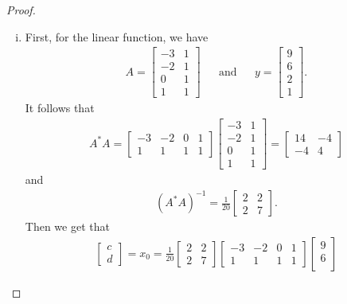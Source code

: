 \documentclass[leqno]{article}
\theoremstyle{nonumberplain}
\newtheorem{proof}{Proof}
\begin{document}
\begin{proof}
\begin{enumerate}[(i)]
\item First, for the linear function, we have 
\begin{align*}
A=\begin{bmatrix}
-3 & 1\\
-2 & 1\\
0 & 1\\
1 & 1
\end{bmatrix}
&&\textrm{and} &&
y=\begin{bmatrix}
9\\
6\\
2\\
1
\end{bmatrix}.
\end{align*}
It follows that
\begin{align*}
A^* A = \begin{bmatrix}
-3 & -2 & 0 & 1\\
1 & 1 & 1 &1
\end{bmatrix}
\begin{bmatrix}
-3 & 1\\
-2 & 1\\
0 & 1\\
1 & 1
\end{bmatrix}=
\begin{bmatrix}
14 & -4\\
-4 & 4
\end{bmatrix}
\end{align*}
and
\begin{align*}
(A^*A)^{-1}=
\frac{1}{20}\begin{bmatrix}
2 & 2\\
2 & 7
\end{bmatrix}.
\end{align*}
Then we get that
\begin{align*}
\begin{bmatrix}
c\\
d
\end{bmatrix}=x_0=\frac{1}{20}\begin{bmatrix}2 & 2\\ 2 & 7 \end{bmatrix} \begin{bmatrix}-3 & -2 & 0 & 1\\
1 & 1 & 1 &1\end{bmatrix} \begin{bmatrix}
9\\
6\\

\end{bmatrix}
\end{align*}
\end{enumerate}
\end{proof}
\end{document}
